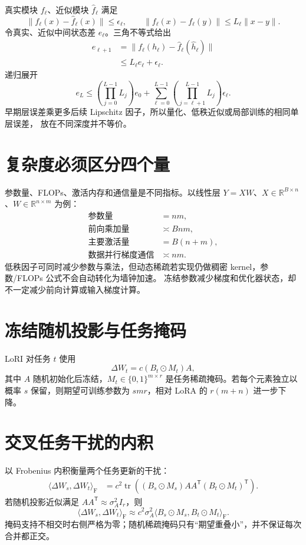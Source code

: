 \documentclass[11pt]{article}
\numberwithin{equation}{section}
\newcommand{\R}{\mathbb{R}}
\newcommand{\1}{\mathbf{1}}
\newcommand{\T}{\mathsf{T}}
\newcommand{\F}{\mathrm{F}}
\newcommand{\tr}{\operatorname{tr}}
\begin{document}
真实模块 $f_\ell$、近似模块 $\widehat f_\ell$ 满足
\begin{equation}
 \|f_\ell(x)-\widehat f_\ell(x)\|\le\epsilon_\ell,
 \qquad
 \|f_\ell(x)-f_\ell(y)\|\le L_\ell\|x-y\|.
\end{equation}
令真实、近似中间状态差 $e_\ell$。三角不等式给出
\begin{align}
 e_{\ell+1}
 &=\|f_\ell(h_\ell)-\widehat f_\ell(\widehat h_\ell)\|\\
 &\le L_\ell e_\ell+\epsilon_\ell.
\end{align}
递归展开
\begin{equation}
 e_L\le
 \left(\prod_{j=0}^{L-1}L_j\right)e_0
 +\sum_{\ell=0}^{L-1}
 \left(\prod_{j=\ell+1}^{L-1}L_j\right)\epsilon_\ell.
\end{equation}
早期层误差乘更多后续 Lipschitz 因子，所以量化、低秩近似或局部训练的相同单层误差，
放在不同深度并不等价。

\section{复杂度必须区分四个量}

参数量、FLOPs、激活内存和通信量是不同指标。以线性层
$Y=XW$、$X\in\R^{B\times n}$、$W\in\R^{n\times m}$ 为例：
\begin{align}
 \text{参数量}&=nm,\\
 \text{前向乘加量}&\asymp Bnm,\\
 \text{主要激活量}&=B(n+m),\\
 \text{数据并行梯度通信}&\asymp nm.
\end{align}
低秩因子可同时减少参数与乘法，但动态稀疏若实现仍做稠密 kernel，参数/FLOPs 公式不会自动转化为墙钟加速。
冻结参数减少梯度和优化器状态，却不一定减少前向计算或输入梯度计算。

\section{冻结随机投影与任务掩码}
LoRI 对任务 $t$ 使用
\begin{equation}
  \Delta W_t=c(B_t\odot M_t)A,
\end{equation}
其中 $A$ 随机初始化后冻结，$M_t\in\{0,1\}^{m\times r}$ 是任务稀疏掩码。若每个元素独立以概率 $s$ 保留，则期望可训练参数为 $smr$，相对 LoRA 的 $r(m+n)$ 进一步下降。

\section{交叉任务干扰的内积}
以 Frobenius 内积衡量两个任务更新的干扰：
\begin{align}
  \langle\Delta W_s,\Delta W_t\rangle_\F
  &=c^2\tr\left((B_s\odot M_s)AA^{\T}(B_t\odot M_t)^{\T}\right).
\end{align}
若随机投影近似满足 $AA^{\T}\approx\sigma_A^2I_r$，则
\begin{equation}
  \langle\Delta W_s,\Delta W_t\rangle_\F
  \approx c^2\sigma_A^2
  \langle B_s\odot M_s,B_t\odot M_t\rangle_\F.
\end{equation}
掩码支持不相交时右侧严格为零；随机稀疏掩码只有“期望重叠小”，并不保证每次合并都正交。
\end{document}
